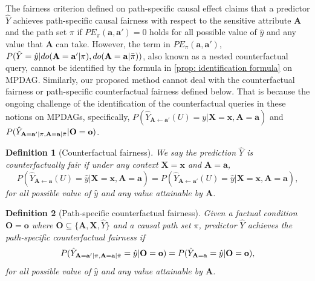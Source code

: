 \documentclass{article} %
\newtheorem{definition}{Definition}[section]
\begin{document}
The fairness criterion defined on path-specific causal effect claims that a predictor $\hat{Y}$ achieves path-specific causal fairness with respect to the sensitive attribute $\mathbf{A}$ and the path set $\pi$ if $PE_{\pi}(\mathbf{a},\mathbf{a'})=0$ holds for all possible value of $\hat{y}$ and any value that $\mathbf{A}$ can take. However, the term in $PE_{\pi}(\mathbf{a},\mathbf{a'})$, $P(\hat{Y}=\hat{y}|do(\mathbf{A=a'}|\pi), do(\mathbf{A=a}|\Bar{\pi}))$, also known as a nested counterfactual query, cannot be identified by the formula in \cref{prop: identification formula} on MPDAG. Similarly, our proposed method cannot deal with the counterfactual fairness or path-specific counterfactual fairness defined below. That is because the ongoing challenge of the identification of the counterfactual queries in these notions on MPDAGs, specifically, $P(\hat{Y}_{\mathbf{A} \gets \mathbf{a'}}(U)=y|\mathbf{X=x},\mathbf{A=a})$ and $P(\hat{Y}_{\mathbf{A=a'}|\pi, \mathbf{A=a}|\Bar{\pi}}|\mathbf{O=o})$.

\begin{definition}[Counterfactual fairness]\citep[Definition 5]{kusner2017counterfactual} \label{def: counterfactual fairness}
    We say the prediction $\hat{Y}$ is counterfactually fair if under any context $\mathbf{X=x}$ and $\mathbf{A=a}$,
    \begin{equation*}\label{eq: counterfactual fairness}
        P(\hat{Y}_{\mathbf{A} \gets \mathbf{a}}(U)=\hat{y}|\mathbf{X=x},\mathbf{A=a})=P(\hat{Y}_{\mathbf{A}\gets{\mathbf{a'}}}(U)=\hat{y}|\mathbf{X=x},\mathbf{A=a}),    
    \end{equation*}
    for all possible value of $\hat{y}$ and any value attainable by $\mathbf{A}$.
\end{definition}

\begin{definition}[Path-specific counterfactual fairness] \citep{chiappa2019path,wu2019pc}
    Given a factual condition $\mathbf{O=o}$ where $\mathbf{O} \subseteq \{\mathbf{A},\mathbf{X},\hat{Y}\}$ and a causal path set $\pi$, predictor $\hat{Y}$ achieves the path-specific counterfactual fairness if 
    \begin{equation*}
        P(\hat{Y}_{\mathbf{A=a'}|\pi, \mathbf{A=a}|\Bar{\pi}}=\hat{y}|\mathbf{O=o})=P(\hat{Y}_{\mathbf{A=a}}=\hat{y}|\mathbf{O=o}),
    \end{equation*}
    for all possible value of $\hat{y}$ and any value attainable by $\mathbf{A}$.
\end{definition}%
\newpage
\end{document}
